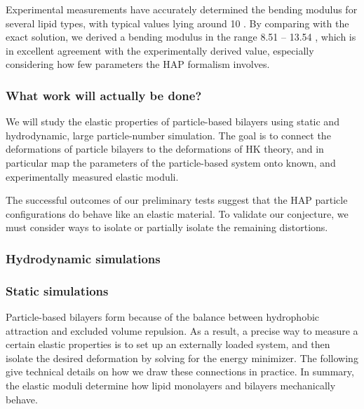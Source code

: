 
Experimental measurements have accurately determined 
the bending modulus for several lipid types, with 
typical values lying around 10 \kBT\; \cite{Naetal15,VeBrPa15,NAGLE2000159,PhysRevLett.113.248102}.
By comparing with the exact solution, we derived a bending modulus
in the range 8.51 -- 13.54 \kBT, which is in 
excellent agreement with the experimentally derived value, especially considering how few parameters the HAP 
formalism involves. 

\newpage

\subsubsection{What work will actually be done?}

We will study the elastic properties of particle-based bilayers using static and hydrodynamic, large particle-number simulation. 
The goal is to connect the deformations of particle bilayers to the deformations of HK theory, and in particular map the parameters of the
particle-based system onto known, and experimentally measured elastic moduli.

The successful outcomes of our preliminary tests suggest that the HAP particle configurations 
do behave like an elastic material. To validate our conjecture, we must consider 
ways to isolate or partially isolate the remaining distortions. 

\subsubsection{Hydrodynamic simulations}

\subsubsection{Static simulations}
Particle-based bilayers form because of the balance between hydrophobic attraction and excluded volume repulsion.
As a result, a precise way to measure a certain elastic properties is to set up an externally loaded system,
and then isolate the desired deformation by solving for the energy minimizer. The following give technical details on how we
draw these connections in practice.
In summary, the elastic moduli determine how lipid monolayers and bilayers mechanically behave.

